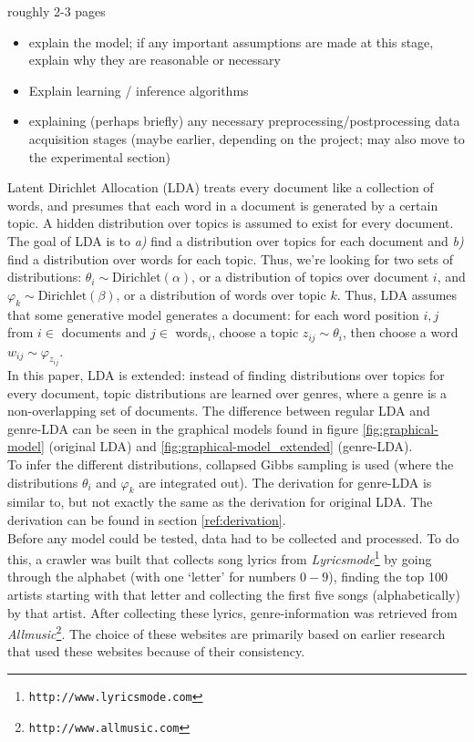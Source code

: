 roughly 2-3 pages
\begin{itemize}
\item explain the model; if any important assumptions are made at this stage, explain why they are reasonable or necessary
\item Explain learning / inference algorithms
\item explaining (perhaps briefly) any necessary preprocessing/postprocessing data acquisition stages (maybe earlier, depending on the project; may also move to the experimental section)
\end{itemize}
Latent Dirichlet Allocation (LDA) treats every document like a collection of words, and presumes that each word in a document is generated by a certain topic. A hidden distribution over topics is assumed to exist for every document. The goal of LDA is to \textit{a)} find a distribution over topics for each document and \textit{b)} find a distribution over words for each topic. Thus, we're looking for two sets of distributions: $\theta_i \sim \text{Dirichlet}(\alpha)$, or a distribution of topics over document $i$, and $\varphi_k \sim \text{Dirichlet}(\beta)$, or a distribution of words over topic $k$. Thus, LDA assumes that some generative model generates a document: for each word position $i,j$ from $i \in$ documents and $j \in$ words$_i$, choose a topic $z_{ij} \sim \theta_i$, then choose a word $w_{ij} \sim \varphi_{z_{ij}}$. \\
In this paper, LDA is extended: instead of finding distributions over topics for every document, topic distributions are learned over genres, where a genre is a non-overlapping set of documents. The difference between regular LDA and genre-LDA can be seen in the graphical models found in figure \ref{fig:graphical-model} (original LDA) and \ref{fig:graphical-model_extended} (genre-LDA). \\
To infer the different distributions, collapsed Gibbs sampling is used (where the distributions $\theta_i$ and $\varphi_k$ are integrated out). The derivation for genre-LDA is similar to, but not exactly the same as the derivation for original LDA. The derivation can be found in section \ref{ref:derivation}.\\
Before any model could be tested, data had to be collected and processed. To do this, a crawler was built that collects song lyrics from \textit{Lyricsmode}\footnote{\texttt{http://www.lyricsmode.com}} by going through the alphabet (with one `letter' for numbers $0-9$), finding the top 100 artists starting with that letter and collecting the first five songs (alphabetically) by that artist. After collecting these lyrics, genre-information was retrieved from \textit{Allmusic}\footnote{\texttt{http://www.allmusic.com}}. The choice of these websites are primarily based on earlier research \cite{felllyrics} that used these websites because of their consistency. \\

